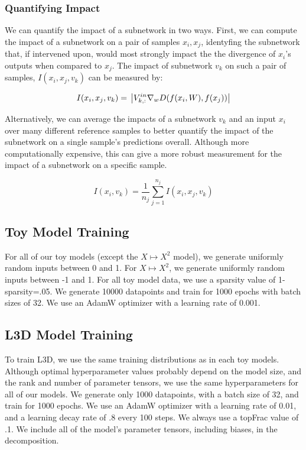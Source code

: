 \documentclass{article}
\theoremstyle{plain}
\theoremstyle{definition}
\theoremstyle{remark}
\begin{document}
\subsubsection{Quantifying Impact}\label{sec:impact}

We can quantify the impact of a subnetwork in two ways. First, we can compute the impact of a subnetwork on a pair of samples $x_i, x_j$, identyfing the subnetwork that, if intervened upon, would most strongly impact the the divergence of $x_i$'s outputs when compared to $x_j$. The impact of subnetwork $v_k$ on such a pair of samples, $I(x_i, x_j, v_k)$ can be measured by:

\begin{equation}
    I(x_i, x_j, v_k) = \\
    \left| V^{in}_{k,:} \nabla_w D(f(x_i, W), f(x_j)) \right|
\end{equation}

Alternatively, we can average the impacts of a subnetwork $v_k$ and an input $x_i$ over many different reference samples to better quantify the impact of the subnetwork on a single sample's predictions overall. Although more computationally expensive, this can give a more robust measurement for the impact of a subnetwork on a specific sample. 

\begin{equation}
    I(x_i, v_k) = \frac{1}{n_j} \sum_{j=1}^{n_j} I(x_i, x_j, v_k)
\end{equation}


\subsection{Toy Model Training}\label{sec:toymodel_hyperparams}

For all of our toy models (except the $X \mapsto X^2$ model), we generate uniformly random inputs between 0 and 1. For $X \mapsto X^2$, we generate uniformly random inputs between -1 and 1. For all toy model data, we use a sparsity value of 1-sparsity=.05. We generate 10000 datapoints and train for 1000 epochs with batch sizes of 32. We use an AdamW optimizer with a learning rate of 0.001. 

\subsection{L3D Model Training}\label{sec:L3D_hyperparams}

To train L3D, we use the same training distributions as in each toy models. Although optimal hyperparameter values probably depend on the model size, and the rank and number of parameter tensors, we use the same hyperparameters for all of our models. We generate only 1000 datapoints, with a batch size of 32, and train for 1000 epochs. We use an AdamW optimizer with a learning rate of 0.01, and a learning decay rate of .8 every 100 steps. We always use a topFrac value of .1.  We include all of the model's parameter tensors, including biases, in the decomposition. 
\end{document}
